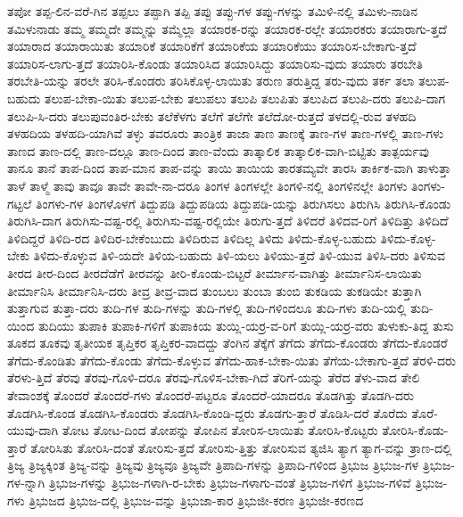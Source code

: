 {ತಪೋ
ತಪ್ಪ-ಲಿನ-ವರೆ-ಗಿನ
ತಪ್ಪಲು
ತಪ್ಪಾಗಿ
ತಪ್ಪಿ
ತಪ್ಪು
ತಪ್ಪು-ಗಳ
ತಪ್ಪು-ಗಳನ್ನು
ತಮಿಳಿ-ನಲ್ಲಿ
ತಮಿಳು-ನಾಡಿನ
ತಮಿಳುನಾಡು
ತಮ್ಮ
ತಮ್ಮದೇ
ತಮ್ಮನ್ನು
ತಮ್ಮೆಲ್ಲಾ
ತಯಾರಕ-ರನ್ನು
ತಯಾರಕ-ರಲ್ಲೇ
ತಯಾರಕರು
ತಯಾರಾಗು-ತ್ತದೆ
ತಯಾರಾದ
ತಯಾರಾಯಿತು
ತಯಾರಿಕೆ
ತಯಾರಿಕೆಗೆ
ತಯಾರಿಕೆಯ
ತಯಾರಿಕೆಯು
ತಯಾರಿಸ-ಬೇಕಾಗು-ತ್ತದೆ
ತಯಾರಿಸ-ಲಾಗು-ತ್ತದೆ
ತಯಾರಿಸಿ-ಕೊಂಡು
ತಯಾರಿಸಿದ
ತಯಾರಿಸಿದ್ದು
ತಯಾರಿಸು-ವುದು
ತಯಾರು
ತರಬೇತಿ
ತರಬೇತಿ-ಯನ್ನು
ತರಲೇ
ತರಿಸಿ-ಕೊಂಡರು
ತರಿಸಿಕೊಳ್ಳ-ಲಾಯಿತು
ತರುಣ
ತರುತ್ತಿದ್ದ
ತರು-ವುದು
ತರ್ಕ
ತಲಾ
ತಲುಪ-ಬಹುದು
ತಲುಪ-ಬೇಕಾ-ಯಿತು
ತಲುಪ-ಬೇಕು
ತಲುಪಲು
ತಲುಪಿ
ತಲುಪಿತು
ತಲುಪಿದ
ತಲುಪಿ-ದರು
ತಲುಪಿ-ದಾಗ
ತಲುಪಿ-ಸಿ-ದರು
ತಲುಪುವಂತಿರ-ಬೇಕು
ತಲೆಕೆಳಗು
ತಲೆಗೆ
ತಲೆಗೇ
ತಲೆದೋ-ರುತ್ತದೆ
ತಳದಲ್ಲಿ-ರುವ
ತಳಹದಿ
ತಳಹದಿಯ
ತಳಹದಿ-ಯಾಗಿವೆ
ತಳ್ಳು
ತವರೂರು
ತಾಂತ್ರಿಕ
ತಾಜಾ
ತಾಣ
ತಾಣಕ್ಕೆ
ತಾಣ-ಗಳ
ತಾಣ-ಗಳಲ್ಲಿ
ತಾಣ-ಗಳು
ತಾಣದ
ತಾಣ-ದಲ್ಲಿ
ತಾಣ-ದಲ್ಲೂ
ತಾಣ-ದಿಂದ
ತಾಣ-ವೆಂದು
ತಾತ್ಕಾಲಿಕ
ತಾತ್ಕಾಲಿಕ-ವಾಗಿ-ಬಿಟ್ಟಿತು
ತಾತ್ಪರ್ಯವು
ತಾನೂ
ತಾನೆ
ತಾಪ-ದಿಂದ
ತಾಪ-ಮಾನ
ತಾಪ-ವನ್ನು
ತಾಯಿ
ತಾಯಿಯ
ತಾರತಮ್ಯವೇ
ತಾರಸಿ
ತಾರ್ಕಿಕ-ವಾಗಿ
ತಾಳುತ್ತಾ
ತಾಳೆ
ತಾಳ್ಮೆ
ತಾವು
ತಾವೂ
ತಾವೇ
ತಾವೇ-ನಾ-ದರೂ
ತಿಂಗಳ
ತಿಂಗಳಲ್ಲೇ
ತಿಂಗಳಿ-ನಲ್ಲಿ
ತಿಂಗಳಿನಲ್ಲೇ
ತಿಂಗಳು
ತಿಂಗಳು-ಗಟ್ಟಲೆ
ತಿಂಗಳು-ಗಳ
ತಿಂಗಳೊಳಗೆ
ತಿದ್ದುಪಡಿ
ತಿದ್ದುಪಡಿಯ
ತಿದ್ದುಪಡಿ-ಯನ್ನು
ತಿರುಗಿಸಲು
ತಿರುಗಿಸಿ
ತಿರುಗಿಸಿ-ಕೊಂಡು
ತಿರುಗಿಸಿ-ದಾಗ
ತಿರುಗಿಸು-ವಷ್ಟ-ರಲ್ಲಿ
ತಿರುಗಿಸು-ವಷ್ಟ-ರಲ್ಲಿಯೇ
ತಿರುಗು-ತ್ತದೆ
ತಿಳಿದರೆ
ತಿಳಿದವ-ರಿಗೆ
ತಿಳಿದಿತ್ತು
ತಿಳಿದಿದೆ
ತಿಳಿದಿದ್ದರೆ
ತಿಳಿದಿ-ರದ
ತಿಳಿದಿರ-ಬೇಕೆಂಬುದು
ತಿಳಿದಿರುವ
ತಿಳಿದಿಲ್ಲ
ತಿಳಿದು
ತಿಳಿದು-ಕೊಳ್ಳ-ಬಹುದು
ತಿಳಿದು-ಕೊಳ್ಳ-ಬೇಕು
ತಿಳಿದು-ಕೊಳ್ಳುವ
ತಿಳಿ-ಯದೇ
ತಿಳಿಯ-ಬಹುದು
ತಿಳಿ-ಯಲು
ತಿಳಿಯು-ತ್ತದೆ
ತಿಳಿ-ಯುವ
ತಿಳಿಸಿ-ದರು
ತಿಳಿಸುವ
ತೀರದ
ತೀರ-ದಿಂದ
ತೀರದೆಡೆಗೆ
ತೀರವನ್ನು
ತೀರಿ-ಕೊಂಡು-ಬಿಟ್ಟರೆ
ತೀರ್ಮಾನ-ವಾಗಿತ್ತು
ತೀರ್ಮಾನಿಸ-ಲಾಯಿತು
ತೀರ್ಮಾನಿಸಿ
ತೀರ್ಮಾನಿಸಿ-ದರು
ತೀವ್ರ
ತೀವ್ರ-ವಾದ
ತುಂಬಲು
ತುಂಬಾ
ತುಂಬಿ
ತುಕಡಿಯ
ತುಕಡಿಯೇ
ತುತ್ತಾಗಿ
ತುತ್ತಾಗುವ
ತುತ್ತಾ-ದರು
ತುದಿ-ಗಳ
ತುದಿ-ಗಳನ್ನು
ತುದಿ-ಗಳಲ್ಲಿ
ತುದಿ-ಗಳಿಂದಲೂ
ತುದಿ-ಗಳು
ತುದಿ-ಯಲ್ಲಿ
ತುದಿ-ಯಿಂದ
ತುದಿಯು
ತುಪಾಕಿ
ತುಪಾಕಿ-ಗಳಿಗೆ
ತುಪಾಕಿಯ
ತುಯ್ಲಿ-ಯರ್ರ-ವ-ರಿಗೆ
ತುಯ್ಲಿ-ಯರ್ರ-ವರು
ತುಳುಕು-ತಿದ್ದ
ತುಸು
ತೂಕದ
ತೂಕವು
ತೃತೀಯಕ
ತೃಪ್ತಿಕರ
ತೃಪ್ತಿಕರ-ವಾದದ್ದು
ತೆಂಗಿನ
ತೆಕ್ಕೆಗೆ
ತೆಗೆದು
ತೆಗೆದು-ಕೊಂಡರು
ತೆಗೆದು-ಕೊಂಡರೆ
ತೆಗೆದು-ಕೊಂಡಿತು
ತೆಗೆದು-ಕೊಂಡು
ತೆಗೆದು-ಕೊಳ್ಳುವ
ತೆಗೆದು-ಹಾಕ-ಬೇಕಾ-ಯಿತು
ತೆಗೆಯ-ಬೇಕಾಗು-ತ್ತದೆ
ತೆರಳಿ-ದರು
ತೆರಳು-ತ್ತಿದೆ
ತೆರವು
ತೆರವು-ಗೊಳಿ-ದರೂ
ತೆರವು-ಗೊಳಿಸ-ಬೇಕಾ-ಗಿದೆ
ತೆರಿಗೆ-ಯನ್ನು
ತೆರೆದ
ತೆಳು-ವಾದ
ತೇಲಿ
ತೇವಾಂಶಕ್ಕೆ
ತೊಂದರೆ
ತೊಂದರೆ-ಗಳು
ತೊಂದರೆ-ಪಟ್ಟರೂ
ತೊಂದರೆ-ಯಾದರೂ
ತೊಡಗಿತ್ತು
ತೊಡಗಿ-ದರು
ತೊಡಗಿಸಿ-ಕೊಂಡ
ತೊಡಗಿಸಿ-ಕೊಂಡರು
ತೊಡಗಿಸಿ-ಕೊಂಡಿ-ದ್ದರು
ತೊಡಗು-ತ್ತಾರೆ
ತೊಡಿಸಿ-ದರೆ
ತೊರೆದು
ತೊರೆ-ಯುವು-ದಾಗಿ
ತೋಟ
ತೋಟ-ದಿಂದ
ತೋಪನ್ನು
ತೋಪಿನ
ತೋರಿಸ-ಲಾಯಿತು
ತೋರಿಸಿ-ಕೊಟ್ಟರು
ತೋರಿಸಿ-ಕೊಡು-ತ್ತಾರೆ
ತೋರಿಸಿತು
ತೋರಿಸಿ-ದಂತೆ
ತೋರಿಸು-ತ್ತದೆ
ತೋರಿಸು-ತ್ತಿತ್ತು
ತೋರಿಸುವ
ತ್ಯಜಿಸಿ
ತ್ಯಾಗ
ತ್ಯಾಗ-ವನ್ನು
ತ್ರಾಣ-ದಲ್ಲಿ
ತ್ರಿಜ್ಯ
ತ್ರಿಜ್ಯಕ್ಕಿಂತ
ತ್ರಿಜ್ಯ-ವನ್ನು
ತ್ರಿಜ್ಯವು
ತ್ರಿಜ್ಯವೂ
ತ್ರಿಜ್ಯವೇ
ತ್ರಿಪಾದಿ-ಗಳನ್ನು
ತ್ರಿಪಾದಿ-ಗಳಿಂದ
ತ್ರಿಭುಜ
ತ್ರಿಭುಜ-ಗಳ
ತ್ರಿಭುಜ-ಗಳ-ನ್ನಾಗಿ
ತ್ರಿಭುಜ-ಗಳನ್ನು
ತ್ರಿಭುಜ-ಗಳಾಗಿ-ರ-ಬೇಕು
ತ್ರಿಭುಜ-ಗಳಾಗು-ವಂತೆ
ತ್ರಿಭುಜ-ಗಳಿಗೆ
ತ್ರಿಭುಜ-ಗಳಿವೆ
ತ್ರಿಭುಜ-ಗಳು
ತ್ರಿಭುಜದ
ತ್ರಿಭುಜ-ದಲ್ಲಿ
ತ್ರಿಭುಜ-ವನ್ನು
ತ್ರಿಭುಜಾ-ಕಾರ
ತ್ರಿಭುಜೀ-ಕರಣ
ತ್ರಿಭುಜೀ-ಕರಣದ
}
